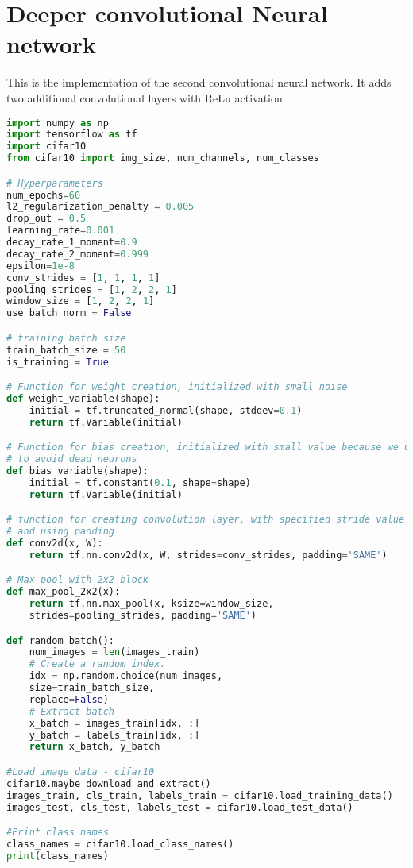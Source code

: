 \chapter{Deeper convolutional Neural network}

This is the implementation of the second convolutional neural network. It adds two additional convolutional layers with ReLu activation.

\begin{lstlisting}[language=Python, label=lst:neuralnet.py, caption={neural\_net.py}, basicstyle=\tiny]
import numpy as np
import tensorflow as tf
import cifar10
from cifar10 import img_size, num_channels, num_classes

# Hyperparameters
num_epochs=60
l2_regularization_penalty = 0.005
drop_out = 0.5
learning_rate=0.001
decay_rate_1_moment=0.9
decay_rate_2_moment=0.999
epsilon=1e-8
conv_strides = [1, 1, 1, 1]
pooling_strides = [1, 2, 2, 1]
window_size = [1, 2, 2, 1]
use_batch_norm = False

# training batch size
train_batch_size = 50
is_training = True

# Function for weight creation, initialized with small noise
def weight_variable(shape):
	initial = tf.truncated_normal(shape, stddev=0.1)
	return tf.Variable(initial)

# Function for bias creation, initialized with small value because we use relu
# to avoid dead neurons
def bias_variable(shape):
	initial = tf.constant(0.1, shape=shape)
	return tf.Variable(initial)

# function for creating convolution layer, with specified stride value
# and using padding
def conv2d(x, W):
	return tf.nn.conv2d(x, W, strides=conv_strides, padding='SAME')

# Max pool with 2x2 block
def max_pool_2x2(x):
	return tf.nn.max_pool(x, ksize=window_size,
	strides=pooling_strides, padding='SAME')

def random_batch():
	num_images = len(images_train)
	# Create a random index.
	idx = np.random.choice(num_images,
	size=train_batch_size,
	replace=False)
	# Extract batch                           
	x_batch = images_train[idx, :]
	y_batch = labels_train[idx, :]
	return x_batch, y_batch

#Load image data - cifar10
cifar10.maybe_download_and_extract()
images_train, cls_train, labels_train = cifar10.load_training_data()
images_test, cls_test, labels_test = cifar10.load_test_data()

#Print class names
class_names = cifar10.load_class_names()
print(class_names)


\end{lstlisting}
